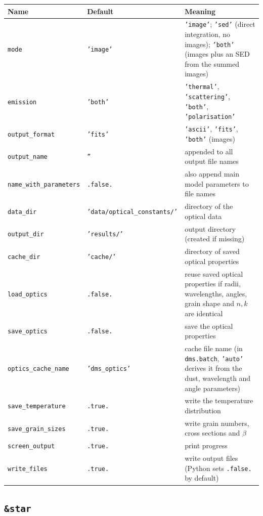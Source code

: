 \documentclass[11pt,a4paper]{article}
\newcommand{\code}[1]{\texttt{#1}}
\begin{document}
\small
\begin{longtable}{@{}R{4.15cm}R{3.4cm}R{7.45cm}@{}}
\toprule
Name & Default & Meaning \\
\midrule
\endhead
\code{mode} & \code{'image'} & \code{'image'}; \code{'sed'} (direct integration, no images);
  \code{'both'} (images plus an SED from the summed images) \\
\code{emission} & \code{'both'} & \code{'thermal'}, \code{'scattering'}, \code{'both'},
  \code{'polarisation'} \\
\code{output\_format} & \code{'fits'} & \code{'ascii'}, \code{'fits'}, \code{'both'} (images) \\
\code{output\_name} & \code{''} & appended to all output file names \\
\code{name\_with\_parameters} & \code{.false.} & also append main model parameters to file names \\
\code{data\_dir} & \code{'data/}\allowbreak\code{optical\_constants/'} & directory of the optical data \\
\code{output\_dir} & \code{'results/'} & output directory (created if missing) \\
\code{cache\_dir} & \code{'cache/'} & directory of saved optical properties \\
\code{load\_optics} & \code{.false.} & reuse saved optical properties if radii, wavelengths, angles,
  grain shape and $n,k$ are identical \\
\code{save\_optics} & \code{.false.} & save the optical properties \\
\code{optics\_cache\_name} & \code{'dms\_optics'} & cache file name (in \code{dms.batch},
  \code{'auto'} derives it from the dust, wavelength and angle parameters) \\
\code{save\_temperature} & \code{.true.} & write the temperature distribution \\
\code{save\_grain\_sizes} & \code{.true.} & write grain numbers, cross sections and $\beta$ \\
\code{screen\_output} & \code{.true.} & print progress \\
\code{write\_files} & \code{.true.} & write output files (Python sets \code{.false.} by default) \\
\bottomrule
\end{longtable}
\normalsize

\subsection{\code{\&star}}
\end{document}
